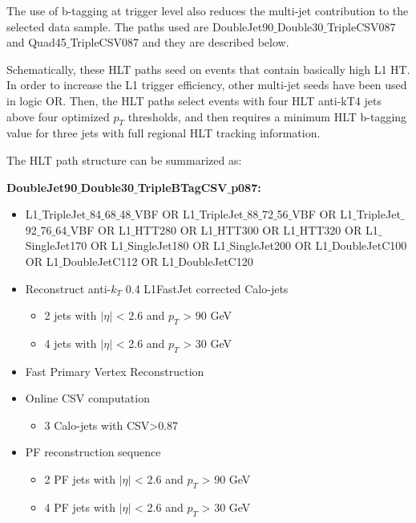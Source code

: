 The use of b-tagging at trigger level also reduces the multi-jet contribution to the selected data sample. The paths used are DoubleJet90$\_$Double30$\_$TripleCSV087 and Quad45$\_$TripleCSV087 and they are described below. 

Schematically, these HLT paths seed on events that contain basically high L1 HT. In order to increase the L1 trigger efficiency, other multi-jet seeds have been used in logic OR. Then, the HLT paths select events with four HLT anti-kT4 jets above four optimized $p_{T}$ thresholds, and then requires a minimum HLT b-tagging value for three jets with full regional HLT tracking information. 

The HLT path structure can be summarized as:

\textbf{DoubleJet90$\_$Double30$\_$TripleBTagCSV$\_$p087:}
\begin{itemize}
	\item L1$\_$TripleJet$\_$84$\_$68$\_$48$\_$VBF OR L1$\_$TripleJet$\_$88$\_$72$\_$56$\_$VBF OR L1$\_$TripleJet$\_$92$\_$76$\_$64$\_$VBF OR L1$\_$HTT280 OR L1$\_$HTT300 OR L1$\_$HTT320 OR L1$\_$SingleJet170 OR L1$\_$SingleJet180 OR L1$\_$SingleJet200 OR L1$\_$DoubleJetC100 OR L1$\_$DoubleJetC112 OR L1$\_$DoubleJetC120
	\item Reconstruct anti-$k_{T}$ 0.4 L1FastJet corrected Calo-jets
	\begin{itemize}
		\item 2 jets with $|\eta|$ < 2.6 and $p_{T}$ > 90 GeV
		\item 4 jets with $|\eta|$ < 2.6 and $p_{T}$ > 30 GeV		
	\end{itemize}
	\item Fast Primary Vertex Reconstruction
	\item Online CSV computation
	\begin{itemize}
		\item 3 Calo-jets with CSV>0.87
	\end{itemize}
	\item PF reconstruction sequence
	\begin{itemize}
		\item 2 PF jets with $|\eta|$ < 2.6 and $p_{T}$ > 90 GeV
		\item 4 PF jets with $|\eta|$ < 2.6 and $p_{T}$ > 30 GeV		
	\end{itemize}
\end{itemize}


